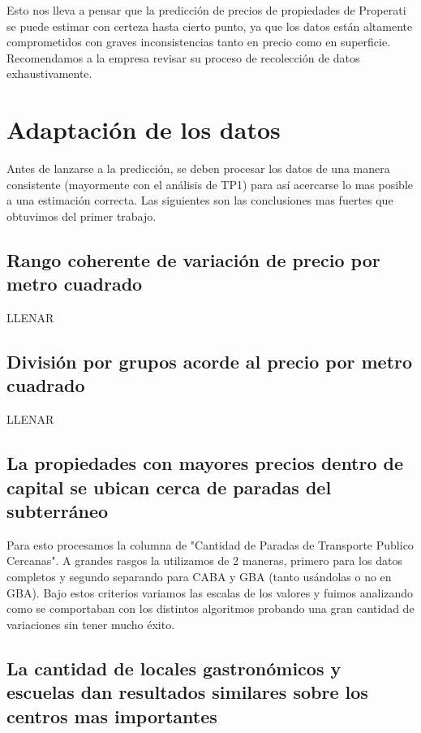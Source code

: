 \documentclass[a4paper, 10pt]{article}
\begin{document}
		Esto nos lleva a pensar que la predicción de precios de propiedades de Properati se puede estimar con certeza hasta cierto punto, ya que los datos están altamente comprometidos con graves inconsistencias tanto en precio como en superficie. Recomendamos a la empresa revisar su proceso de recolección de datos exhaustivamente. 		
		
	\section{Adaptación de los datos}
		
		Antes de lanzarse a la predicción, se deben procesar los datos de una manera consistente (mayormente con el análisis de TP1) para así acercarse lo mas posible a una estimación correcta. Las siguientes son las conclusiones mas fuertes que obtuvimos del primer trabajo.
		
		\subsection{Rango coherente de variación de precio por metro cuadrado}
		LLENAR
		
		\subsection{División por grupos acorde al precio por metro cuadrado}
		LLENAR
			
		\subsection{La propiedades con mayores precios dentro de capital se ubican cerca de paradas del subterráneo}
		
		Para esto procesamos la columna de "Cantidad de Paradas de Transporte Publico Cercanas". A grandes rasgos la utilizamos de 2 maneras, primero para los datos completos y segundo separando para CABA y GBA (tanto usándolas o no en GBA). Bajo estos criterios variamos las escalas de los valores y fuimos analizando como se comportaban con los distintos algoritmos probando una gran cantidad de variaciones sin tener mucho éxito.

		\subsection{La cantidad de locales gastronómicos y escuelas dan resultados similares sobre los centros mas importantes} 
		
\end{document}
